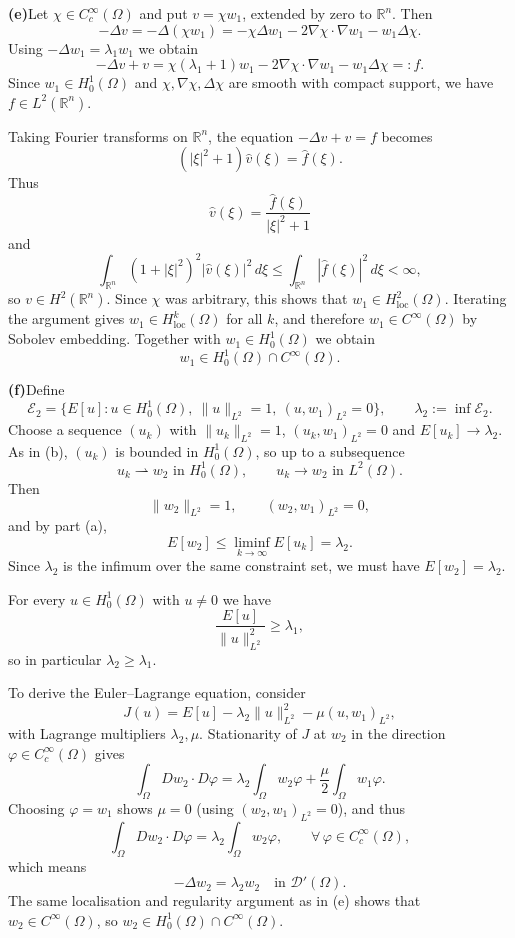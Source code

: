 \begin{solution}
\par\medskip\noindent\textbf{(e)}\quad  Let $\chi\in C_c^\infty(\Omega)$ and put $v=\chi w_1$,
extended by zero to $\mathbb{R}^n$. Then
\[
-\Delta v = -\Delta(\chi w_1)
= -\chi\Delta w_1 - 2\nabla\chi\cdot\nabla w_1 - w_1\Delta\chi.
\]
Using $-\Delta w_1=\lambda_1 w_1$ we obtain
\[
-\Delta v + v
= \chi(\lambda_1+1)w_1 - 2\nabla\chi\cdot\nabla w_1 - w_1\Delta\chi
=:f.
\]
Since $w_1\in H_0^1(\Omega)$ and $\chi,\nabla\chi,\Delta\chi$ are smooth with
compact support, we have $f\in L^2(\mathbb{R}^n)$.

Taking Fourier transforms on $\mathbb{R}^n$, the equation
$-\Delta v + v = f$ becomes
\[
(|\xi|^2+1)\widehat{v}(\xi)=\widehat{f}(\xi).
\]
Thus
\[
\widehat{v}(\xi)=\frac{\widehat{f}(\xi)}{|\xi|^2+1}
\]
and
\[
\int_{\mathbb{R}^n}(1+|\xi|^2)^2|\widehat{v}(\xi)|^2\,d\xi
\le\int_{\mathbb{R}^n}|\widehat{f}(\xi)|^2\,d\xi<\infty,
\]
so $v\in H^2(\mathbb{R}^n)$. Since $\chi$ was arbitrary, this shows that
$w_1\in H^2_{\mathrm{loc}}(\Omega)$. Iterating the argument gives
$w_1\in H^k_{\mathrm{loc}}(\Omega)$ for all $k$, and therefore
$w_1\in C^\infty(\Omega)$ by Sobolev embedding. Together with
$w_1\in H_0^1(\Omega)$ we obtain
\[
w_1\in H_0^1(\Omega)\cap C^\infty(\Omega).
\]

\par\medskip\noindent\textbf{(f)}\quad  Define
\[
\mathcal{E}_2
=\{E[u]:u\in H_0^1(\Omega),\ \|u\|_{L^2}=1,\ (u,w_1)_{L^2}=0\},
\qquad
\lambda_2:=\inf\mathcal{E}_2.
\]
Choose a sequence $(u_k)$ with $\|u_k\|_{L^2}=1$,
$(u_k,w_1)_{L^2}=0$ and $E[u_k]\to\lambda_2$. As in (b),
$(u_k)$ is bounded in $H_0^1(\Omega)$, so up to a subsequence
\[
u_k\rightharpoonup w_2\text{ in }H_0^1(\Omega),
\qquad
u_k\to w_2\text{ in }L^2(\Omega).
\]
Then
\[
\|w_2\|_{L^2}=1,\qquad (w_2,w_1)_{L^2}=0,
\]
and by part (a),
\[
E[w_2]\le\liminf_{k\to\infty}E[u_k]=\lambda_2.
\]
Since $\lambda_2$ is the infimum over the same constraint set,
we must have $E[w_2]=\lambda_2$.

For every $u\in H_0^1(\Omega)$ with $u\neq 0$ we have
\[
\frac{E[u]}{\|u\|_{L^2}^2}\ge\lambda_1,
\]
so in particular $\lambda_2\ge\lambda_1$.

To derive the Euler--Lagrange equation, consider
\[
J(u)=E[u]-\lambda_2\|u\|_{L^2}^2-\mu (u,w_1)_{L^2},
\]
with Lagrange multipliers $\lambda_2,\mu$. Stationarity of $J$ at $w_2$
in the direction $\varphi\in C_c^\infty(\Omega)$ gives
\[
\int_\Omega Dw_2\cdot D\varphi
=\lambda_2\int_\Omega w_2\varphi + \frac{\mu}{2}\int_\Omega w_1\varphi.
\]
Choosing $\varphi=w_1$ shows $\mu=0$ (using $(w_2,w_1)_{L^2}=0$), and thus
\[
\int_\Omega Dw_2\cdot D\varphi
=\lambda_2\int_\Omega w_2\varphi,\qquad
\forall\,\varphi\in C_c^\infty(\Omega),
\]
which means
\[
-\Delta w_2=\lambda_2 w_2\quad\text{in }\mathcal{D}'(\Omega).
\]
The same localisation and regularity argument as in (e) shows that
$w_2\in C^\infty(\Omega)$, so $w_2\in H_0^1(\Omega)\cap C^\infty(\Omega)$.
\end{solution}

